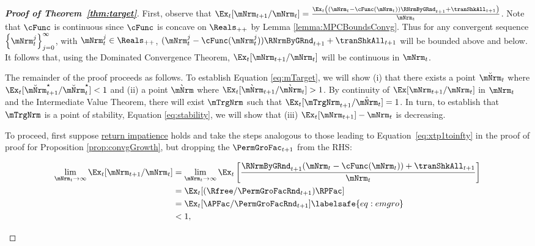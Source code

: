 \documentclass[\econtexRoot/BufferStockTheory]{subfiles}
\begin{document}
\begin{proof}[\textbf{Proof of Theorem~\ref{thm:target}}]

First, observe that $\Ex_{t}[{\mNrm}_{t+1}/\mNrm_t] = \frac{\Ex_{t}\left((\mNrm_t - \cFunc(\mNrm_t)) \RNrmByGRnd_{t+1} + \tranShkAll_{t+1}\right)}{\mNrm_t}$.
Note that $\cFunc$ is continuous since $\cFunc$ is concave on $\Reals_{++}$ by Lemma \ref{lemma:MPCBoundsConvg}.
Thus for any convergent sequence $\left\{\mNrm_t^{j}\right\}_{j=0}^{\infty}$, with $\mNrm_t^{j}\in \Reals_{++}$, $(\mNrm_t^{j} - \cFunc(\mNrm_t^{j})) \RNrmByGRnd_{t+1} + \tranShkAll_{t+1}$ will be bounded above and below.
It follows that, using the Dominated Convergence Theorem, $\Ex_{t}[{\mNrm}_{t+1}/\mNrm_t]$ will be continuous in $\mNrm_t$.




The remainder of the proof proceeds as follows.
To establish Equation \eqref{eq:mTarget}, we will show (i) that there exists a point $\breve{\mNrm}_{t}$ where $\Ex_t [\breve{\mNrm}_{t+1}^{\star}/\breve{\mNrm}_{t}^{\star}] < 1$ and (ii) a point $\grave{\mNrm}$ where $\Ex_t [\grave{\mNrm}_{t+1}/\grave{\mNrm}_{t}] > 1$.
By continuity of $\Ex[{\mNrm}_{t+1}/\mNrm_t]$ in $\mNrm_t$ and the Intermediate Value Theorem, there will exist $\mTrgNrm$ such that  $\Ex_t [{\mTrgNrm}_{t+1}/\hat{\mNrm}_{t}] = 1$.
In turn, to establish that $\mTrgNrm$ is a point of stability, Equation \eqref{eq:stability}, we will show that (iii) $\Ex_t [{\mNrm}_{t+1}]-\mNrm_{t}$ is decreasing.



To proceed, first suppose \hyperlink{RIC}{return impatience} holds and take the steps analogous to those leading to Equation~\eqref{eq:xtp1toinfty} in the proof of proof for Proposition \ref{prop:convgGrowth},  but dropping the $\PermGroFac_{t+1}$ from the RHS:
\begin{samepage}
\begin{equation}\begin{gathered}\begin{aligned}
  \lim_{\mNrm_{t} \rightarrow \infty} \Ex_{t}[{\mNrm}_{t+1}/\mNrm_{t}]  & =   
                                                                       \lim_{\mNrm_{t} \rightarrow \infty} 
                                                                       \Ex_{t}\left[\frac{\RNrmByGRnd_{t+1}(\mNrm_{t}-\cFunc(\mNrm_{t}))+{\tranShkAll}_{t+1}}{\mNrm_{t}}\right] \notag 
  \\  & = \Ex_{t}[(\Rfree/{\PermGroFacRnd}_{t+1})\RPFac]  \notag
  \\  & = \Ex_{t}[{\APFac}/{\PermGroFacRnd}_{t+1}]  \labelsafe{eq:emgro}
  \\  & < 1, \notag
\end{aligned}\end{gathered}\end{equation}
\end{samepage}


\end{proof}
\end{document}
